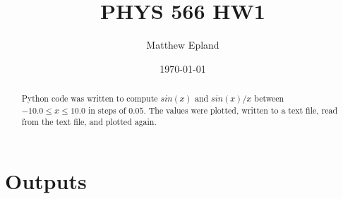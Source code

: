 \documentclass[notitlepage,aps,prd,nofootinbib]{revtex4-1}
\begin{document}
\title{PHYS 566 HW1}
\author{Matthew Epland}

\date{\today}

\begin{abstract}
Python code was written to compute $sin\left(x\right)$ and $sin\left(x\right)/x$ between $-10.0 \le x \le 10.0$ in steps of $0.05$. The values were plotted, written to a text file, read from the text file, and plotted again.
\end{abstract}\maketitle

\section{Outputs}
\end{document}
